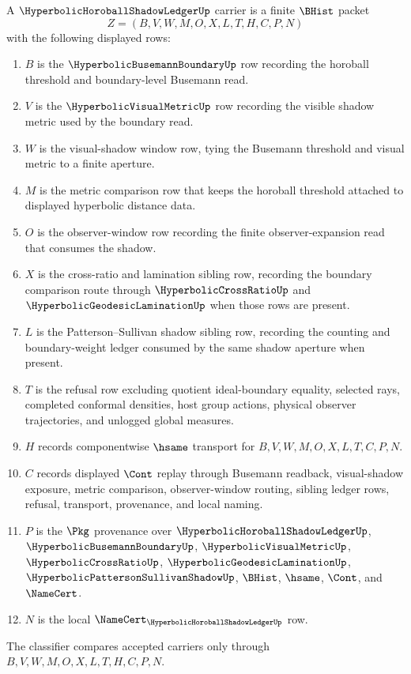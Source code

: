 \begin{definition}
\label{def:hyperbolic-horoball-shadow-ledger-carrier}
A $\HyperbolicHoroballShadowLedgerUp$ carrier is a finite $\BHist$ packet
$$
Z=(B,V,W,M,O,X,L,T,H,C,P,N)
$$
with the following displayed rows:
\begin{enumerate}
\item $B$ is the $\HyperbolicBusemannBoundaryUp$ row recording the horoball threshold and boundary-level Busemann read.
\item $V$ is the $\HyperbolicVisualMetricUp$ row recording the visible shadow metric used by the boundary read.
\item $W$ is the visual-shadow window row, tying the Busemann threshold and visual metric to a finite aperture.
\item $M$ is the metric comparison row that keeps the horoball threshold attached to displayed hyperbolic distance data.
\item $O$ is the observer-window row recording the finite observer-expansion read that consumes the shadow.
\item $X$ is the cross-ratio and lamination sibling row, recording the boundary comparison route through $\HyperbolicCrossRatioUp$ and $\HyperbolicGeodesicLaminationUp$ when those rows are present.
\item $L$ is the Patterson--Sullivan shadow sibling row, recording the counting and boundary-weight ledger consumed by the same shadow aperture when present.
\item $T$ is the refusal row excluding quotient ideal-boundary equality, selected rays, completed conformal densities, host group actions, physical observer trajectories, and unlogged global measures.
\item $H$ records componentwise $\hsame$ transport for $B,V,W,M,O,X,L,T,C,P,N$.
\item $C$ records displayed $\Cont$ replay through Busemann readback, visual-shadow exposure, metric comparison, observer-window routing, sibling ledger rows, refusal, transport, provenance, and local naming.
\item $P$ is the $\Pkg$ provenance over $\HyperbolicHoroballShadowLedgerUp$, $\HyperbolicBusemannBoundaryUp$, $\HyperbolicVisualMetricUp$, $\HyperbolicCrossRatioUp$, $\HyperbolicGeodesicLaminationUp$, $\HyperbolicPattersonSullivanShadowUp$, $\BHist$, $\hsame$, $\Cont$, and $\NameCert$.
\item $N$ is the local $\NameCert_{\HyperbolicHoroballShadowLedgerUp}$ row.
\end{enumerate}
The classifier compares accepted carriers only through $B,V,W,M,O,X,L,T,H,C,P,N$.
\end{definition}

